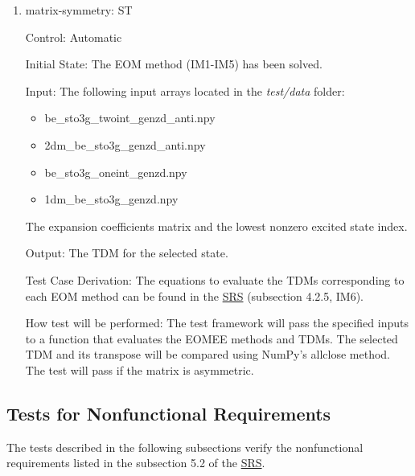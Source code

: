\documentclass[12pt, titlepage]{article}
\newcounter{systnum} %
\begin{document}
\begin{enumerate}
	
	\item{matrix-symmetry: ST\thesystnum \label{ST4}\\}
	
	Control: Automatic
	
	Initial State: The EOM method (IM1-IM5) has been solved.
	
	Input: The following input arrays located in the \textit{test/data} folder:
	\begin{itemize}
		\item be\_sto3g\_twoint\_genzd\_anti.npy
		\item 2dm\_be\_sto3g\_genzd\_anti.npy
		\item be\_sto3g\_oneint\_genzd.npy
		\item 1dm\_be\_sto3g\_genzd.npy
	\end{itemize}
	The expansion coefficients matrix and the lowest nonzero excited state 
	index. 
	
	Output: The TDM for the selected state.
	
	Test Case Derivation: The equations to evaluate the TDMs corresponding to 
	each EOM method can be found in the 
	\href{https://github.com/gabrielasd/eomee/tree/cas741/docs/SRS} 
	{SRS} (subsection 4.2.5, IM6).
	
	How test will be performed: 
	The test framework will pass the specified inputs to a function that 
	evaluates the EOMEE methods and TDMs. The selected TDM and its transpose 
	will be compared using NumPy's allclose method. The test will pass if the 
	matrix is asymmetric. 
	
\end{enumerate}


\subsection{Tests for Nonfunctional Requirements}

%
The tests described in the following subsections verify the nonfunctional 
requirements listed in the subsection 5.2 of the 
\href{https://github.com/gabrielasd/eomee/tree/cas741/docs/SRS} {SRS}.
\end{document}

